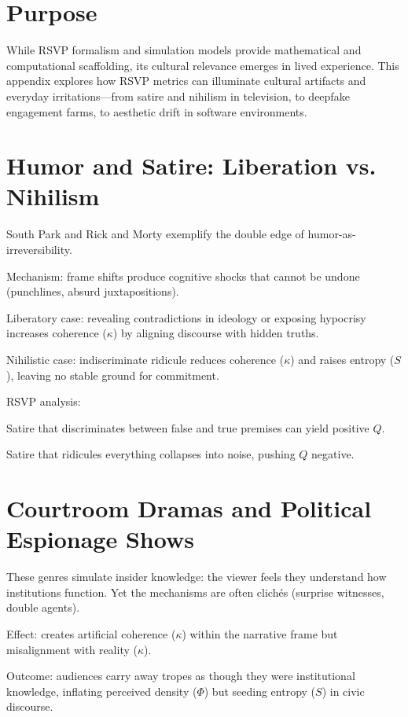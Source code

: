 \documentclass{book}
\begin{document}
\section{Purpose}

While RSVP formalism and simulation models provide mathematical and computational scaffolding, its cultural relevance emerges in lived experience. This appendix explores how RSVP metrics can illuminate cultural artifacts and everyday irritations—from satire and nihilism in television, to deepfake engagement farms, to aesthetic drift in software environments.

\section{Humor and Satire: Liberation vs. Nihilism}

South Park and Rick and Morty exemplify the double edge of humor-as-irreversibility.

Mechanism: frame shifts produce cognitive shocks that cannot be undone (punchlines, absurd juxtapositions).

Liberatory case: revealing contradictions in ideology or exposing hypocrisy increases coherence (\( \kappa \)) by aligning discourse with hidden truths.

Nihilistic case: indiscriminate ridicule reduces coherence (\( \kappa \)) and raises entropy (\( S \)), leaving no stable ground for commitment.

RSVP analysis:

Satire that discriminates between false and true premises can yield positive \( Q \).

Satire that ridicules everything collapses into noise, pushing \( Q \) negative.

\section{Courtroom Dramas and Political Espionage Shows}

These genres simulate insider knowledge: the viewer feels they understand how institutions function. Yet the mechanisms are often clichés (surprise witnesses, double agents).

Effect: creates artificial coherence (\( \kappa \)) within the narrative frame but misalignment with reality (\( \kappa \)).

Outcome: audiences carry away tropes as though they were institutional knowledge, inflating perceived density (\( \Phi \)) but seeding entropy (\( S \)) in civic discourse.
\end{document}
